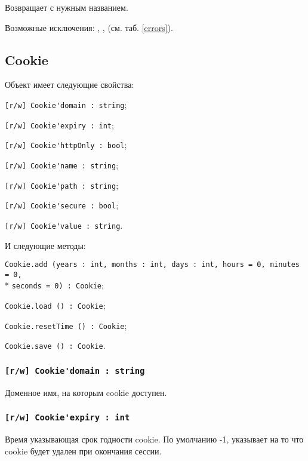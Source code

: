 Возвращает \cookie{} с нужным названием.

Возможные исключения: , ,  (см. таб. \ref{errors}).

\subsection{{\color{orange} Cookie}}

Объект \cookie{} имеет следующие свойства:
\begin{icItems}
	\item \lstinline|[r/w] Cookie'domain : string|;
	\item \lstinline|[r/w] Cookie'expiry : int|;
	\item \lstinline|[r/w] Cookie'httpOnly : bool|;
	\item \lstinline|[r/w] Cookie'name : string|;
	\item \lstinline|[r/w] Cookie'path : string|;
	\item \lstinline|[r/w] Cookie'secure : bool|;
	\item \lstinline|[r/w] Cookie'value : string|.
\end{icItems}

И следующие методы:
\begin{icItems}
	\item \lstinline|Cookie.add (years : int, months : int, days : int, hours = 0, minutes = 0,|\\* \lstinline|seconds = 0) : Cookie|;
	\item \lstinline|Cookie.load () : Cookie|;
	\item \lstinline|Cookie.resetTime () : Cookie|;
	\item \lstinline|Cookie.save () : Cookie|.
\end{icItems}

\subsubsection{\lstinline|[r/w] Cookie'domain : string|}

Доменное имя, на которым cookie доступен.

\subsubsection{\lstinline|[r/w] Cookie'expiry : int|}

Время указывающая срок годности cookie. По умолчанию -1, указывает на то что cookie будет удален при окончания сессии.

